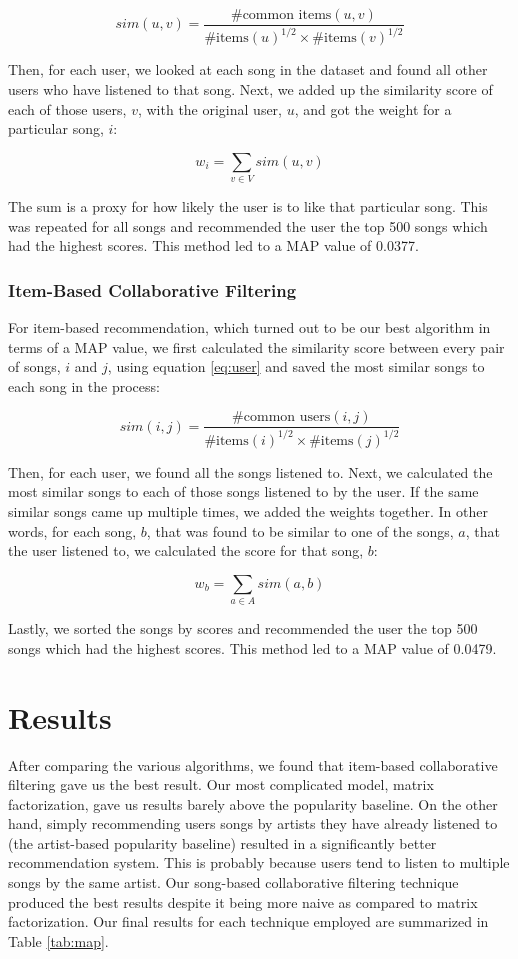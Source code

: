 \documentclass[11pt,preprint]{aastex}
\begin{document}
\begin{equation}
sim(u,v) = \frac{\text{\# common items}(u, v)}{{\text{\# items}(u)}^{1/2} \times {\text{\# items}(v)}^{1/2}}
\label{eq:item}
\end{equation}

Then, for each user, we looked at each song in the dataset and found all other users who have listened to that song. Next, we added up the similarity score of each of those users, $v$, with the original user, $u$, and got the weight for a particular song, $i$:  

$$w_i = \sum_{v \in V} sim(u, v)$$

The sum is a proxy for how likely the user is to like that particular song. This was repeated for all songs and recommended the user the top 500 songs which had the highest scores. This method led to a MAP value of 0.0377.

\subsubsection{Item-Based Collaborative Filtering}
For item-based recommendation, which turned out to be our best algorithm in terms of a MAP value, we first calculated the similarity score between every pair of songs, $i$ and $j$, using equation \ref{eq:user} and saved the most similar songs to each song in the process:

\begin{equation}
sim(i,j) = \frac{\text{\# common users}(i, j)}{{\text{\# items}(i)}^{1/2} \times {\text{\# items}(j)}^{1/2}}
\label{eq:user}
\end{equation}

Then, for each user, we found all the songs listened to. Next, we calculated the most similar songs to each of those songs listened to by the user. If the same similar songs came up multiple times, we added the weights together. In other words, for each song, $b$, that was found to be similar to one of the songs, $a$, that the user listened to, we calculated the score for that song, $b$:

$$w_b = \sum_{a \in A} sim(a, b)$$

Lastly, we sorted the songs by scores and recommended the user the top 500 songs which had the highest scores. This method led to a MAP value of 0.0479.


\section{Results}
After comparing the various algorithms, we found that item-based collaborative filtering gave us the best result. Our most complicated model, matrix factorization, gave us results barely above the popularity baseline. On the other hand, simply recommending users songs by artists they have already listened to (the artist-based popularity baseline) resulted in a significantly better recommendation system. This is probably because users tend to listen to multiple songs by the same artist. Our song-based collaborative filtering technique produced the best results despite it being more naive as compared to matrix factorization. Our final results for each technique employed are summarized in Table \ref{tab:map}. 
\end{document}
